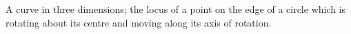 A curve in three dimensions; the locus of a point on the
edge of a circle which is rotating about its centre and moving 
along its axis of rotation.
